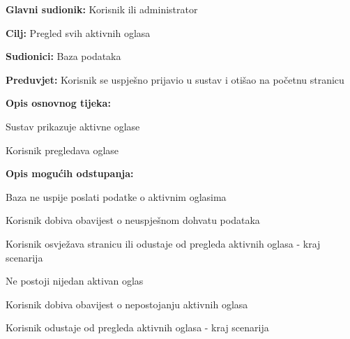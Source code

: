 					\noindent {}
					\begin{packed_item}
	
						\item \textbf{Glavni sudionik: }Korisnik ili administrator
						\item  \textbf{Cilj:} Pregled svih aktivnih oglasa
						\item  \textbf{Sudionici:} Baza podataka
						\item  \textbf{Preduvjet:} Korisnik se uspješno prijavio u sustav i otišao na početnu stranicu
						\item  \textbf{Opis osnovnog tijeka:}
						
						\item[] \begin{packed_enum}
							\item Sustav prikazuje aktivne oglase
							\item Korisnik pregledava oglase
						\end{packed_enum}
						\item  \textbf{Opis mogućih odstupanja:}

						\item[] \begin{packed_item}
							\item[1.a] Baza ne uspije poslati podatke o aktivnim oglasima
							\item[] \begin{packed_enum}
								
								\item Korisnik dobiva obavijest o neuspješnom dohvatu podataka
								\item Korisnik osvježava stranicu ili odustaje od pregleda aktivnih oglasa - kraj scenarija
							
							\end{packed_enum}	
							\item[1.b] Ne postoji nijedan aktivan oglas
							\item[] \begin{packed_enum}
								
								\item Korisnik dobiva obavijest o nepostojanju aktivnih oglasa
								\item Korisnik odustaje od pregleda aktivnih oglasa - kraj scenarija
							
							\end{packed_enum}
						\end{packed_item}	
					\end{packed_item}

